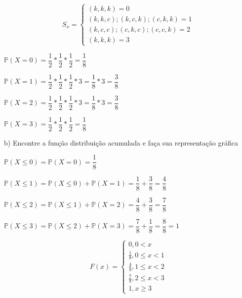 \documentclass[12pt,a4paper]{article}
\begin{document}
\begin{center}
	\[
	S_{x} =
	\begin{cases}
	(k,k,k) = 0 \\
	(k,k,c);(k,c,k);(c,k,k) = 1\\
	(k,c,c);(c,k,c);(c,c,k) = 2\\
	(k,k,k) = 3
	\end{cases}
	\]
	
	\vspace{0.5cm}
	$\mathbb{P}(X=0) = \dfrac{1}{2}*\dfrac{1}{2}*\dfrac{1}{2} = \dfrac{1}{8}$
	
	\vspace{0.5cm}
	$\mathbb{P}(X=1) = \dfrac{1}{2}*\dfrac{1}{2}*\dfrac{1}{2}*3 = \dfrac{1}{8}*3 = \dfrac{3}{8}$
	
	\vspace{0.5cm}
	$\mathbb{P}(X=2) = \dfrac{1}{2}*\dfrac{1}{2}*\dfrac{1}{2}*3 = \dfrac{1}{8}*3 = \dfrac{3}{8}$
	
	\vspace{0.5cm}
	$\mathbb{P}(X=3) = \dfrac{1}{2}*\dfrac{1}{2}*\dfrac{1}{2} = \dfrac{1}{8}$
\end{center}

\vspace{1cm}
b)  Encontre a função distribuição acumulada e faça sua representação gráfica
\begin{center}
	\vspace{0.25cm}
	$\mathbb{P}(X\leq{0}) = \mathbb{P}(X=0) = \dfrac{1}{8}$
	
	\vspace{0.5cm}
	$\mathbb{P}(X\leq1) = \mathbb{P}(X\leq{0}) + \mathbb{P}(X=1) = \dfrac{1}{8} + \dfrac{3}{8} = \dfrac{4}{8}$
	
	\vspace{0.5cm}
	$\mathbb{P}(X\leq{2}) = \mathbb{P}(X\leq1) + \mathbb{P}(X=2) = \dfrac{4}{8} + \dfrac{3}{8} = \dfrac{7}{8}$
	
	\vspace{0.5cm}
	$\mathbb{P}(X\leq{3}) = \mathbb{P}(X\leq{2}) + \mathbb{P}(X=3) = \dfrac{7}{8} + \dfrac{1}{8} = \dfrac{8}{8} = 1$
	
	\[
	F(x) =
	\begin{cases}
	0, 0 < x \\
	\frac{1}{8}, 0\leq{x} < 1 \\
	\frac{4}{8}, 1\leq{x} < 2\\
	\frac{7}{8}, 2\leq{x} < 3\\
	1,x\geq{3}
	\end{cases}
	\]
	
	\vspace{1cm}
\end{center}
\end{document}
